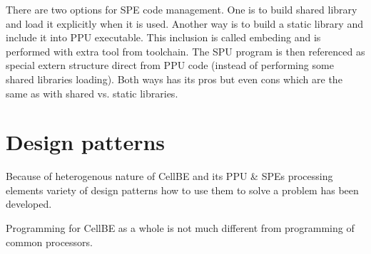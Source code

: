 \par
There are two options for SPE code management. One is to build shared library and load it explicitly when it is used. Another way is to build a static library and include it into PPU executable. This inclusion is called embeding and is performed with extra tool from toolchain. The SPU program is then referenced as special extern structure direct from PPU code (instead of performing some shared libraries loading). Both ways has its pros but even cons which are the same as with shared vs. static libraries.

\section {Design patterns}

Because of heterogenous nature of CellBE and its PPU & SPEs processing elements variety of design patterns how to use them to solve a problem has been developed.

Programming for CellBE as a whole is not much different from programming of common processors. 